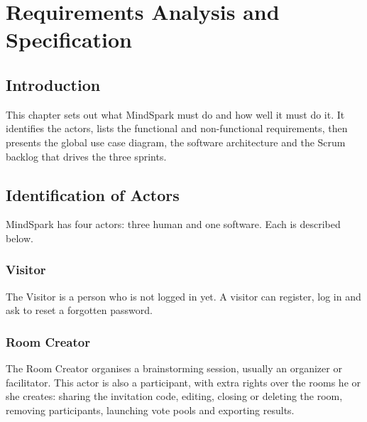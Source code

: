 \documentclass[12pt,a4paper]{report}
\begin{document}
\tableofcontents
%
%

\chapter{Requirements Analysis and Specification}
\label{chap:requirements}

\section{Introduction}
\label{sec:req-intro}

This chapter sets out what MindSpark must do and how well it must do it. It identifies the actors, lists the functional and non-functional requirements, then presents the global use case diagram, the software architecture and the Scrum backlog that drives the three sprints.



\section{Identification of Actors}
\label{sec:actors}

MindSpark has four actors: three human and one software. Each is described below.

\subsection{Visitor}

The Visitor is a person who is not logged in yet. A visitor can register, log in and ask to reset a forgotten password.

\subsection{Room Creator}

The Room Creator organises a brainstorming session, usually an organizer or facilitator. This actor is also a participant, with extra rights over the rooms he or she creates: sharing the invitation code, editing, closing or deleting the room, removing participants, launching vote pools and exporting results.
\end{document}
